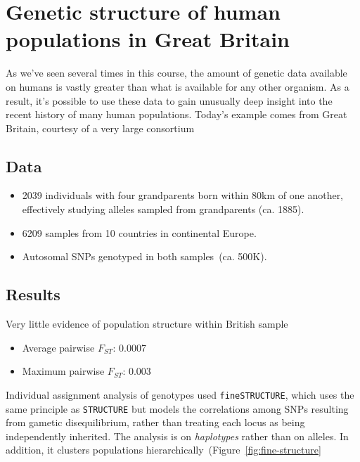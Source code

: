 \documentclass[12pt]{article}
\begin{document}
\section*{Genetic structure of human populations in Great Britain}

As we've seen several times in this course, the amount of genetic data
available on humans is vastly greater than what is available for any
other organism. As a result, it's possible to use these data to gain
unusually deep insight into the recent history of many human
populations. Today's example comes from Great Britain, courtesy of a
very large consortium~\cite{Leslie-etal-2015}

\subsection*{Data}

\begin{itemize}

\item 2039 individuals with four grandparents born within 80km of one
  another, effectively studying alleles sampled from grandparents
  (ca. 1885). 

\item 6209 samples from 10 countries in continental Europe.

\item Autosomal SNPs genotyped in both samples~(ca. 500K). 

\end{itemize}

\subsection*{Results}

Very little evidence of population structure within British sample

\begin{itemize}

\item Average pairwise $F_{ST}$: 0.0007

\item Maximum pairwise $F_{ST}$: 0.003

\end{itemize}

Individual assignment analysis of genotypes used {\tt fineSTRUCTURE},
which uses the same principle as {\tt STRUCTURE} but models the
correlations among SNPs resulting from gametic disequilibrium, rather
than treating each locus as being independently inherited. The
analysis is on {\it haplotypes\/} rather than on alleles. In addition,
it clusters populations
hierarchically~(Figure~\ref{fig:fine-structure}
\end{document}

